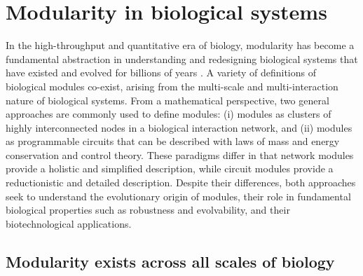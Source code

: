 \section{Modularity in biological systems}

In the high-throughput and quantitative era of biology, modularity has become a fundamental abstraction in understanding and redesigning biological systems that have existed and evolved for billions of years \citep{hartwell1999, wagner2007}.
A variety of definitions of biological modules co-exist, arising from the multi-scale and multi-interaction nature of biological systems.
From a mathematical perspective, two general approaches are commonly used to define modules: (i) modules as clusters of highly interconnected nodes in a biological interaction network, and (ii) modules as programmable circuits that can be described with laws of mass and energy conservation and control theory.
These paradigms differ in that network modules provide a holistic and simplified description, while circuit modules provide a reductionistic and detailed description.
Despite their differences, both approaches seek to understand the evolutionary origin of modules, their role in fundamental biological properties such as robustness and evolvability, and their biotechnological applications.

\subsection{Modularity exists across all scales of biology}

